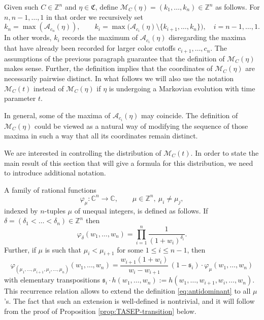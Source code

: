 \documentclass[11pt,reqno]{amsart}
\theoremstyle{definition}
\theoremstyle{remark}
\theoremstyle{remark}
\def\leq{\leqslant}
\def\C{\mathcal{C}}
\renewcommand\le{\leq}
\def\Z{\mathbb Z}
\def\C{\mathbb C}
\def\A{\mathcal A}
\def\M{\mathcal M}
\numberwithin{equation}{section}
\begin{document}
	Given such $C\in \Z^n$ and $\eta\in\mathfrak C$, define $\M_C(\eta)=(k_1,\dots,k_n)\in\Z^n$ as follows. For $n,n-1,\dots,1$ in that order we recursively set
	\begin{equation}\label{eq:maximums}
		k_n=\max(\A_{c_n}(\eta)), \qquad k_i=\max\bigl(\A_{c_i}(\eta)\setminus \{k_{i+1},\dots,k_n\}\bigr), \quad i=n-1,\dots,1.
	\end{equation}
	In other words, $k_i$ records the maximum of $\A_{c_i}(\eta)$ disregarding the maxima that have already been recorded for larger color cutoffs $c_{i+1},\dots,c_n$. The assumptions of the previous paragraph guarantee that the definition of $\M_C(\eta)$ makes sense. Further, the definition implies that the coordinates of $\M_C(\eta)$ are necessarily pairwise distinct. In what follows we will also use the notation $\M_C(t)$ instead of $\M_C(\eta)$ if $\eta$ is undergoing a Markovian evolution with time parameter $t$.  
	
	In general, some of the maxima of $\A_{c_i}(\eta)$ may coincide. The definition of $\M_C(\eta)$ could be viewed as a natural way of modifying the sequence of those maxima in such a way that all its coordinates remain distinct. 
	
	We are interested in controlling the distribution of $\M_C(t)$. In order to state the main result of this section that will give a formula for this distribution, we need to introduce additional notation. 
	
	A family of rational functions 
	$$
	\varphi_\mu: \C^n \to \C, \qquad \mu\in \Z^n,\  \mu_i\ne \mu_j,
	$$
	indexed by $n$-tuples $\mu$ of unequal integers, is defined as follows. If $\delta=(\delta_1<\dots<\delta_n)\in\Z^n$ then 
	\begin{equation}\label{eq:antidominant}
		\varphi_\delta (w_1,\dots,w_n)=\prod_{i=1}^n \frac1{(1+w_i)^{\delta_i}}.
	\end{equation}
	Further, if $\mu$ is such that $\mu_i<\mu_{i+1}$ for some $1\le i\le n-1$, then 
	\begin{equation}
		\label{eq:phi-exchange}
		\varphi_{(\mu_1,\dots,\mu_{i+1},\mu_i,\dots,\mu_n)}(w_1,\dots,w_n)=\frac{w_{i+1}(1+w_i)}{w_{i}-w_{i+1}}\,(1-\mathfrak{s}_i)
		\cdot \varphi_\mu(w_1,\dots,w_n)
	\end{equation}
	with elementary transpositions $\mathfrak s_i\cdot h(w_1,\dots,w_n):=h(w_1,\dots,w_{i+1},w_i,\dots,w_n)$. This recurrence relation allows to extend the definition \eqref{eq:antidominant} to all $\mu$'s. The fact that such an extension is well-defined is nontrivial, and it will follow from the proof of Proposition \ref{prop:TASEP-transition} below. 
	
\end{document}
